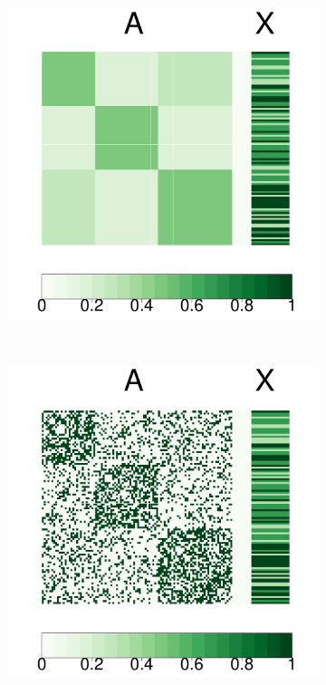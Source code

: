 \documentclass[12pt]{article}
\theoremstyle{definition}
\begin{document}
\begin{figure}[H]
	\centering
	\begin{subfigure}[b]{0.23\textwidth}
		\includegraphics[width=\textwidth]{../Figure/Pmat.pdf}
		\caption{}
		\label{fig:a}
	\end{subfigure}
	~ %
	\begin{subfigure}[b]{0.23\textwidth}
		\includegraphics[width=\textwidth]{../Figure/Amat.pdf}

\end{subfigure}
\end{figure}
\end{document}
